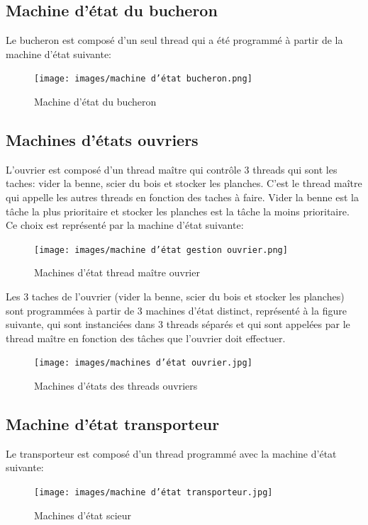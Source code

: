 \documentclass[a4paper, 12pt, oneside]{article}
\begin{document}
        \subsection{Machine d'état du bucheron}
        Le bucheron est composé d'un seul thread qui a été programmé à partir de la machine d'état suivante:
        \begin{figure}[H]
            \centering
            \texttt{[image: images/machine d'état bucheron.png]}
            \caption{Machine d'état du bucheron}
        \end{figure}
         
        \newpage
        \subsection{Machines d'états ouvriers}
        L'ouvrier est composé d'un thread maître qui contrôle 3 threads qui sont les taches: vider la benne, scier du bois et stocker les planches. C'est
        le thread maître qui appelle les autres threads en fonction des taches à faire. Vider la benne est la tâche la plus prioritaire et stocker les planches 
        est la tâche la moins prioritaire. Ce choix est représenté par la machine d'état suivante:
        \begin{figure}[H]
            \centering
            \texttt{[image: images/machine d'état gestion ouvrier.png]}
            \caption{Machines d'état thread maître ouvrier}
        \end{figure}

        \newpage
        Les 3 taches de l'ouvrier (vider la benne, scier du bois et stocker les planches) sont programmées à partir de 3 machines d'état distinct, représenté à la 
        figure suivante, qui sont instanciées dans 3 threads séparés et qui sont appelées par le thread maître en fonction des tâches que l'ouvrier doit effectuer.
        \begin{figure}[H]
            \centering
            \texttt{[image: images/machines d'état ouvrier.jpg]}
            \caption{Machines d'états des threads ouvriers}
       \end{figure}

        \newpage
        \subsection{Machine d'état transporteur}
        Le transporteur est composé d'un thread programmé avec la machine d'état suivante:
        \begin{figure}[H]
            \centering
            \texttt{[image: images/machine d'état transporteur.jpg]}
            \caption{Machines d'état scieur}
        \end{figure}
\end{document}
